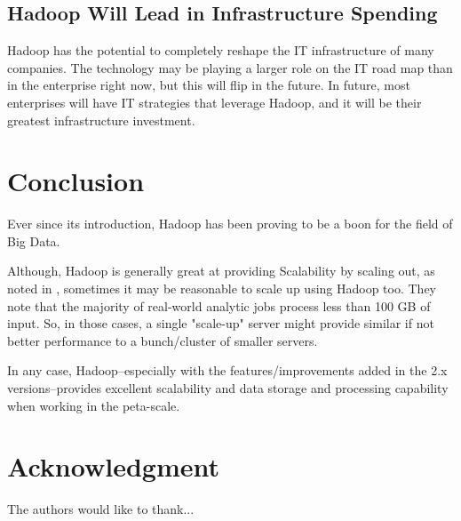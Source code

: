 \documentclass[conference]{IEEEtran}
\begin{document}
\subsection{Hadoop Will Lead in Infrastructure Spending}
Hadoop has the potential to completely reshape the IT infrastructure of many companies. The technology may be playing a larger role on the IT road map than in the enterprise right now, but this will flip in the future. In future, most enterprises will have IT strategies that leverage Hadoop, and it will be their greatest infrastructure investment.

\section{Conclusion}

Ever since its introduction, Hadoop has been proving to be a boon for the field of Big Data. 

Although, Hadoop is generally great at providing Scalability by scaling out, as noted in \cite{Appuswamy2013}, sometimes it may be 
reasonable to scale up using Hadoop too. They note that the majority of real-world analytic jobs process less than 100 GB of input. 
So, in those cases, a single "scale-up" server might provide similar if not better performance to a bunch/cluster of smaller servers.

In any case, Hadoop--especially with the features/improvements added in the 2.x versions--provides excellent scalability and data storage and processing
capability when working in the peta-scale.

\appendices
\section*{Acknowledgment}

The authors would like to thank...


\ifCLASSOPTIONcaptionsoff
  \newpage
\fi
\end{document}
